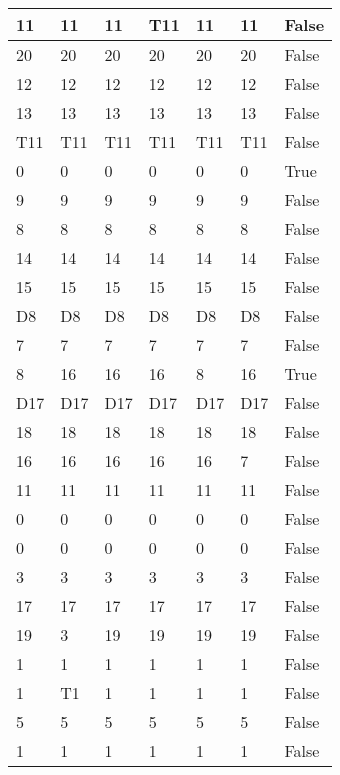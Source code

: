 \begin{longtable}[htbp]{| p{} | p{} | p{}| p{}| p{}| p{}| p{}|}
11 & 11 & 11 & \multicolumn{1}{l|}{T11} & 11 & 11 & False \\ \hline
20 & 20 & 20 & 20 & 20 & 20 & False \\ \hline
12 & 12 & 12 & 12 & 12 & 12 & False \\ \hline
13 & 13 & 13 & 13 & 13 & 13 & False \\ \hline
\multicolumn{1}{|l|}{T11} & \multicolumn{1}{l|}{T11} & \multicolumn{1}{l|}{T11} & \multicolumn{1}{l|}{T11} & \multicolumn{1}{l|}{T11} & \multicolumn{1}{l|}{T11} & False \\ \hline
0 & 0 & 0 & 0 & 0 & 0 & True \\ \hline
9 & 9 & 9 & 9 & 9 & 9 & False \\ \hline
8 & 8 & 8 & 8 & 8 & 8 & False \\ \hline
14 & 14 & 14 & 14 & 14 & 14 & False \\ \hline
15 & 15 & 15 & 15 & 15 & 15 & False \\ \hline
\multicolumn{1}{|l|}{D8} & \multicolumn{1}{l|}{D8} & \multicolumn{1}{l|}{D8} & \multicolumn{1}{l|}{D8} & \multicolumn{1}{l|}{D8} & \multicolumn{1}{l|}{D8} & False \\ \hline
7 & 7 & 7 & 7 & 7 & 7 & False \\ \hline
8 & 16 & 16 & 16 & 8 & 16 & True \\ \hline
\multicolumn{1}{|l|}{D17} & \multicolumn{1}{l|}{D17} & \multicolumn{1}{l|}{D17} & \multicolumn{1}{l|}{D17} & \multicolumn{1}{l|}{D17} & \multicolumn{1}{l|}{D17} & False \\ \hline
18 & 18 & 18 & 18 & 18 & 18 & False \\ \hline
16 & 16 & 16 & 16 & 16 & 7 & False \\ \hline
11 & 11 & 11 & 11 & 11 & 11 & False \\ \hline
0 & 0 & 0 & 0 & 0 & 0 & False \\ \hline
0 & 0 & 0 & 0 & 0 & 0 & False \\ \hline
3 & 3 & 3 & 3 & 3 & 3 & False \\ \hline
17 & 17 & 17 & 17 & 17 & 17 & False \\ \hline
19 & 3 & 19 & 19 & 19 & 19 & False \\ \hline
1 & 1 & 1 & 1 & 1 & 1 & False \\ \hline
1 & \multicolumn{1}{l|}{T1} & 1 & 1 & 1 & 1 & False \\ \hline
5 & 5 & 5 & 5 & 5 & 5 & False \\ \hline
1 & 1 & 1 & 1 & 1 & 1 & False \\ \hline

\end{longtable}
